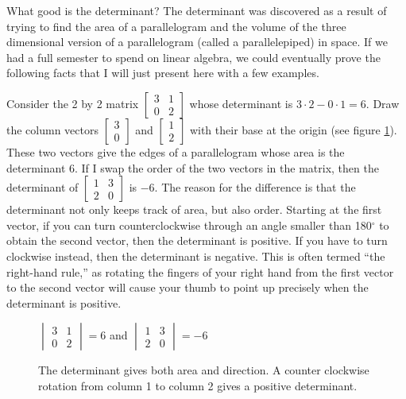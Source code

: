 What good is the determinant?  
The determinant was discovered as a result of trying to find the area of a parallelogram and the volume of the three dimensional version of a parallelogram (called a parallelepiped) in space. 
If we had a full semester to spend on linear algebra, we could eventually prove the following facts that I will just present here with a few examples.

Consider the 2 by 2 matrix $\begin{bmatrix}3&1\\0&2\end{bmatrix}$ whose determinant is $3\cdot 2-0\cdot 1=6$. Draw the column vectors $\begin{bmatrix}3\\0\end{bmatrix}$ and $\begin{bmatrix}1\\2\end{bmatrix}$ with their base at the origin (see figure \ref{detfig}). 
These two vectors give the edges of a parallelogram whose area is the determinant $6$.  If I swap the order of the two vectors in the matrix, then the determinant of $\begin{bmatrix}1&3\\2&0\end{bmatrix}$ is $-6$.  The reason for the difference is that the determinant not only keeps track of area, but also order. Starting at the first vector, if you can turn counterclockwise through an angle smaller than 180$^\circ$ to obtain the second vector, then the determinant is positive.  If you have to turn clockwise instead, then the determinant is negative.  This is often termed ``the right-hand rule,'' as rotating the fingers of your right hand from the first vector to the second vector will cause your thumb to point up precisely when the determinant is positive.
\begin{figure}[h]
\begin{center}

\vspace{2pt}
$\begin{vmatrix}{3}&{1}\\{0}&{2}\end{vmatrix}=6$ and $\begin{vmatrix}{1}&{3}\\{2}&0\end{vmatrix}=-6$
\end{center}
\caption{The determinant gives both area and direction. A counter clockwise rotation from column 1 to column 2 gives a positive determinant.\label{detfig}}
\end{figure}

